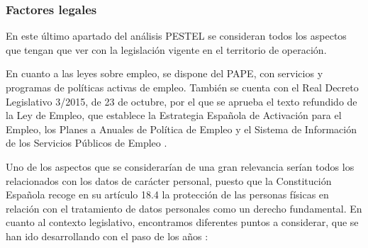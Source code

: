 \clearpage

\subsubsection{Factores legales}
En este último apartado del análisis PESTEL se consideran todos los aspectos que tengan que ver con la legislación vigente en el territorio de operación.

En cuanto a las leyes sobre empleo, se dispone del \acf{PAPE}, con servicios y programas de políticas activas de empleo. También se cuenta con el Real Decreto Legislativo 3/2015, de 23 de octubre, por el que se aprueba el texto refundido de la Ley de Empleo, que establece la Estrategia Española de Activación para el Empleo, los Planes a Anuales de Política de Empleo y el Sistema de Información de los Servicios Públicos de Empleo \cite{politicassepe}.

Uno de los aspectos que se considerarían de una gran relevancia serían todos los relacionados con los datos de carácter personal, puesto que la Constitución Española recoge en su artículo 18.4 la protección de las personas físicas en relación con el tratamiento de datos personales como un derecho fundamental. En cuanto al contexto legislativo, encontramos diferentes puntos a considerar, que se han ido desarrollando con el paso de los años \cite{aepdnormativa}:

